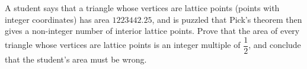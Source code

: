 A student says that a triangle whose vertices are lattice points (points with integer coordinates) has area $1223442.25$, and is puzzled that Pick's theorem then gives a non-integer number of interior lattice points. Prove that the area of every triangle whose vertices are lattice points is an integer multiple of $\dfrac{1}{2}$, and conclude that the student's area must be wrong.
